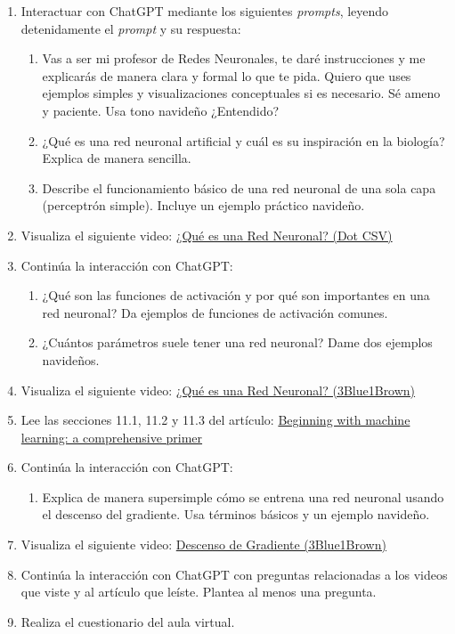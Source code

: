 \documentclass[a4,11pt]{aleph-notas}
\begin{document}
\begin{enumerate}[leftmargin=*]
    \item Interactuar con ChatGPT mediante los siguientes \textit{prompts}, leyendo detenidamente el \textit{prompt} y su respuesta:
    \begin{enumerate}[label=\textit{Prompt \arabic*.},leftmargin=2.1cm]
        \item Vas a ser mi profesor de Redes Neuronales, te daré instrucciones y me explicarás de manera clara y formal lo que te pida. Quiero que uses ejemplos simples y visualizaciones conceptuales si es necesario. Sé ameno y paciente. Usa tono navideño ¿Entendido?
        \item ¿Qué es una red neuronal artificial y cuál es su inspiración en la biología? Explica de manera sencilla.
        \item Describe el funcionamiento básico de una red neuronal de una sola capa (perceptrón simple). Incluye un ejemplo práctico navideño.
    \end{enumerate}
    \item Visualiza el siguiente video: \href{https://youtu.be/MRIv2IwFTPg?si=6ocz4bs1Wi5SkeSz}{¿Qué es una Red Neuronal? (Dot CSV)}
    \item Continúa la interacción con ChatGPT:
    \begin{enumerate}[label=\textit{Prompt \arabic*.},leftmargin=2.1cm, start=4]
        \item ¿Qué son las funciones de activación y por qué son importantes en una red neuronal? Da ejemplos de funciones de activación comunes.
        \item ¿Cuántos parámetros suele tener una red neuronal? Dame dos ejemplos navideños.
    \end{enumerate}
    \item Visualiza el siguiente video: \href{https://youtu.be/aircAruvnKk?si=vFg4G6iUMV9GdcNN}{¿Qué es una Red Neuronal? (3Blue1Brown)}
    \item Lee las secciones 11.1, 11.2 y 11.3 del artículo: \href{https://link.springer.com/article/10.1140/epjs/s11734-021-00209-7}{Beginning with machine learning: a comprehensive primer}
    \item Continúa la interacción con ChatGPT:
    \begin{enumerate}[label=\textit{Prompt \arabic*.},leftmargin=2.1cm, start=6]
        \item Explica de manera supersimple cómo se entrena una red neuronal usando el descenso del gradiente. Usa términos básicos y un ejemplo navideño.
    \end{enumerate}
    \item Visualiza el siguiente video: \href{https://youtu.be/IHZwWFHWa-w?si=U9QD1W0kRQhPWaV9}{Descenso de Gradiente (3Blue1Brown)}
    \item Continúa la interacción con ChatGPT con preguntas relacionadas a los videos que viste y al artículo que leíste. Plantea al menos una pregunta.
    \item Realiza el cuestionario del aula virtual.
\end{enumerate}
\end{document}
